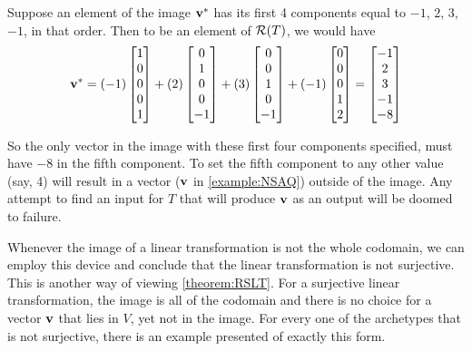 \documentclass{ximera}
\begin{document}
\begin{example}
Suppose an element of the image $\mathbf{v^*}$ has its first 4 components equal to $-1$, $2$, $3$, $-1$, in that order.  Then to be an element of $\mathcal{R}\!\left(T\right)$, we would have
\[
\mathbf{v^*}=(-1)\begin{bmatrix}1\\0\\0\\0\\1\end{bmatrix}+(2)\begin{bmatrix}0\\1\\0\\0\\-1\end{bmatrix}+(3)
\begin{bmatrix}0\\0\\1\\0\\-1\end{bmatrix}+(-1)\begin{bmatrix}0\\0\\0\\1\\2\end{bmatrix}
=\begin{bmatrix}-1\\2\\3\\-1\\-8\end{bmatrix}
\]


So the only vector in the image with these first four components specified, must have $-8$ in the fifth component.  To set the fifth component to any other value (say, 4) will result in a vector ($\mathbf{v}$ in \ref{example:NSAQ})  outside of the image.  Any attempt to find an input for $T$ that will produce $\mathbf{v}$ as an output will be doomed to failure.



Whenever the image of a linear transformation is not the whole codomain, we can employ this device and conclude that the linear transformation is not surjective.
This is another way of viewing \ref{theorem:RSLT}.  For a surjective linear transformation, the image is all of the codomain and there is no choice for a vector $\mathbf{v}$ that lies in $V$, yet not in the image.  For every one of the archetypes that is not surjective, there is an example presented of exactly this form.



\end{example}
\end{document}
